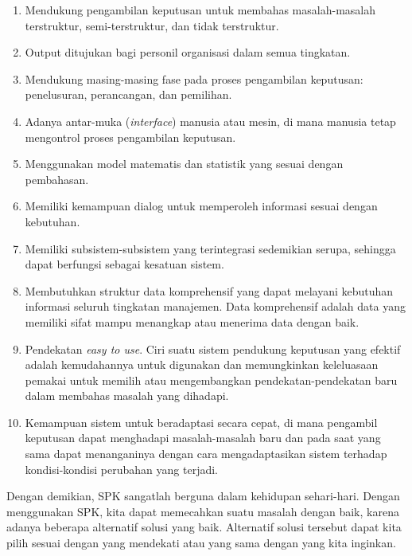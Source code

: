 \documentclass[a4paper,twoside]{article}
\begin{document}
\begin{enumerate}
		\begin{enumerate}
			\item Mendukung pengambilan keputusan untuk membahas masalah-masalah terstruktur, semi-terstruktur, dan tidak terstruktur.
			\item Output ditujukan bagi personil organisasi dalam semua tingkatan.
			\item Mendukung masing-masing fase pada proses pengambilan keputusan: penelusuran, perancangan, dan pemilihan.
			\item Adanya antar-muka (\textit{interface}) manusia atau mesin, di mana manusia tetap mengontrol proses pengambilan keputusan.
			\item Menggunakan model matematis dan statistik yang sesuai dengan pembahasan.
			\item Memiliki kemampuan dialog untuk memperoleh informasi sesuai dengan kebutuhan.
			\item Memiliki subsistem-subsistem yang terintegrasi sedemikian serupa, sehingga dapat berfungsi sebagai kesatuan sistem.
			\item Membutuhkan struktur data komprehensif yang dapat melayani kebutuhan informasi seluruh tingkatan manajemen. Data komprehensif adalah data yang memiliki sifat mampu menangkap atau menerima data dengan baik.
			\item Pendekatan \textit{easy to use}. Ciri suatu sistem pendukung keputusan yang efektif adalah kemudahannya untuk digunakan dan memungkinkan keleluasaan pemakai untuk memilih atau mengembangkan pendekatan-pendekatan baru dalam membahas masalah yang dihadapi.
			\item Kemampuan sistem untuk beradaptasi secara cepat, di mana pengambil keputusan dapat menghadapi masalah-masalah baru dan pada saat yang sama dapat menanganinya dengan cara mengadaptasikan sistem terhadap kondisi-kondisi perubahan yang terjadi.
		\end{enumerate}
		
		Dengan demikian, SPK sangatlah berguna dalam kehidupan sehari-hari. Dengan menggunakan SPK, kita dapat memecahkan suatu masalah dengan baik, karena adanya beberapa alternatif solusi yang baik. Alternatif solusi tersebut dapat kita pilih sesuai dengan yang mendekati atau yang sama dengan yang kita inginkan.
		

\end{enumerate}
\end{document}
